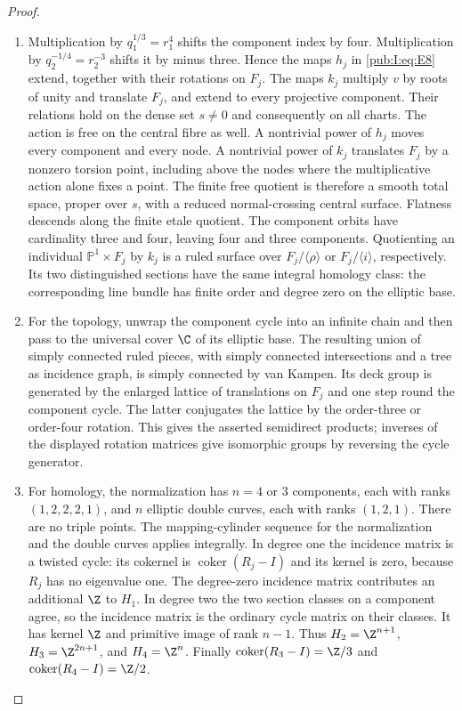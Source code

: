 \begin{proof}
\begin{enumerate}[label=\arabic*.,leftmargin=*]
\item Multiplication by $q_1^{1/3}=r_1^4$ shifts the component index by four.
Multiplication by $q_2^{-1/4}=r_2^{-3}$ shifts it by minus three.
Hence the maps $h_j$ in \eqref{pub:I:eq:E8} extend, together with their rotations
on $F_j$. The maps $k_j$ multiply $v$ by roots of unity and translate
$F_j$, and extend to every projective component. Their relations
hold on the dense set $s\ne0$ and consequently on all charts.
The action is free on the central fibre as well. A nontrivial power
of $h_j$ moves every component and every node. A nontrivial power
of $k_j$ translates $F_j$ by a nonzero torsion point, including
above the nodes where the multiplicative action alone fixes a point.
The finite free quotient is therefore a smooth total space, proper
over $s$, with a reduced normal-crossing central surface. Flatness
descends along the finite etale quotient. The component orbits have
cardinality three and four, leaving four and three components.
Quotienting an individual $\mathbb P^1\times F_j$ by $k_j$ is a
ruled surface over $F_j/\langle\rho\rangle$ or
$F_j/\langle i\rangle$, respectively. Its two distinguished
sections have the same integral homology class: the corresponding
line bundle has finite order and degree zero on the elliptic base.

\item For the topology, unwrap the component cycle into an infinite chain
and then pass to the universal cover $\C$ of its elliptic base.
The resulting union of simply connected ruled pieces, with
simply connected intersections and a tree as incidence graph, is
simply connected by van Kampen. Its deck group is generated by
the enlarged lattice of translations on $F_j$ and one step round
the component cycle. The latter conjugates the lattice by the
order-three or order-four rotation. This gives the asserted
semidirect products; inverses of the displayed rotation matrices
give isomorphic groups by reversing the cycle generator.

\item For homology, the normalization has $n=4$ or $3$ components, each
with ranks $(1,2,2,2,1)$, and $n$ elliptic double curves, each with
ranks $(1,2,1)$. There are no triple points. The mapping-cylinder
sequence for the normalization and the double curves applies
integrally. In degree one the incidence matrix is a twisted cycle:
its cokernel is $\operatorname{coker}(R_j-I)$ and its kernel is
zero, because $R_j$ has no eigenvalue one. The degree-zero incidence
matrix contributes an additional $\Z$ to $H_1$. In degree two the
two section classes on a component agree, so the incidence matrix
is the ordinary cycle matrix on their classes. It has kernel
$\Z$ and primitive image of rank $n-1$. Thus $H_2=\Z^{n+1}$,
$H_3=\Z^{2n+1}$, and $H_4=\Z^n$. Finally
$\operatorname{coker}(R_3-I)=\Z/3$ and
$\operatorname{coker}(R_4-I)=\Z/2$. 
\end{enumerate}
\end{proof}